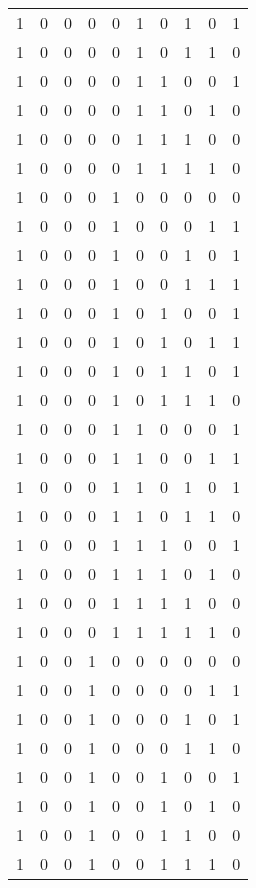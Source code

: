 \begin{longtable}[c]{rrrrrrrrrr}
        1 & 0 & 0 & 0 & 0 & 1 & 0 & 1 & 0 & 1 \\
        1 & 0 & 0 & 0 & 0 & 1 & 0 & 1 & 1 & 0 \\
        1 & 0 & 0 & 0 & 0 & 1 & 1 & 0 & 0 & 1 \\
        1 & 0 & 0 & 0 & 0 & 1 & 1 & 0 & 1 & 0 \\
        1 & 0 & 0 & 0 & 0 & 1 & 1 & 1 & 0 & 0 \\
        1 & 0 & 0 & 0 & 0 & 1 & 1 & 1 & 1 & 0 \\
        1 & 0 & 0 & 0 & 1 & 0 & 0 & 0 & 0 & 0 \\
        1 & 0 & 0 & 0 & 1 & 0 & 0 & 0 & 1 & 1 \\
        1 & 0 & 0 & 0 & 1 & 0 & 0 & 1 & 0 & 1 \\
        1 & 0 & 0 & 0 & 1 & 0 & 0 & 1 & 1 & 1 \\
        1 & 0 & 0 & 0 & 1 & 0 & 1 & 0 & 0 & 1 \\
        1 & 0 & 0 & 0 & 1 & 0 & 1 & 0 & 1 & 1 \\
        1 & 0 & 0 & 0 & 1 & 0 & 1 & 1 & 0 & 1 \\
        1 & 0 & 0 & 0 & 1 & 0 & 1 & 1 & 1 & 0 \\
        1 & 0 & 0 & 0 & 1 & 1 & 0 & 0 & 0 & 1 \\
        1 & 0 & 0 & 0 & 1 & 1 & 0 & 0 & 1 & 1 \\
        1 & 0 & 0 & 0 & 1 & 1 & 0 & 1 & 0 & 1 \\
        1 & 0 & 0 & 0 & 1 & 1 & 0 & 1 & 1 & 0 \\
        1 & 0 & 0 & 0 & 1 & 1 & 1 & 0 & 0 & 1 \\
        1 & 0 & 0 & 0 & 1 & 1 & 1 & 0 & 1 & 0 \\
        1 & 0 & 0 & 0 & 1 & 1 & 1 & 1 & 0 & 0 \\
        1 & 0 & 0 & 0 & 1 & 1 & 1 & 1 & 1 & 0 \\
        1 & 0 & 0 & 1 & 0 & 0 & 0 & 0 & 0 & 0 \\
        1 & 0 & 0 & 1 & 0 & 0 & 0 & 0 & 1 & 1 \\
        1 & 0 & 0 & 1 & 0 & 0 & 0 & 1 & 0 & 1 \\
        1 & 0 & 0 & 1 & 0 & 0 & 0 & 1 & 1 & 0 \\
        1 & 0 & 0 & 1 & 0 & 0 & 1 & 0 & 0 & 1 \\
        1 & 0 & 0 & 1 & 0 & 0 & 1 & 0 & 1 & 0 \\
        1 & 0 & 0 & 1 & 0 & 0 & 1 & 1 & 0 & 0 \\
        1 & 0 & 0 & 1 & 0 & 0 & 1 & 1 & 1 & 0 \\

\end{longtable}
